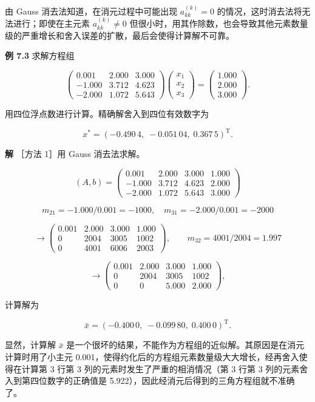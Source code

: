 \documentclass[
  10pt,
  fontset=fandol]{ctexart}
\begin{document}
由 Gauss 消去法知道，在消元过程中可能出现 \(a_{kk}^{(k)}=0\) 的情况，这时消去法将无法进行；即使在主元素 \(a_{kk}^{(k)}\ne0\) 但很小时，用其作除数，也会导致其他元素数量级的严重增长和舍入误差的扩散，最后会使得计算解不可靠。

\textbf{例 7.3} 求解方程组

\[
\begin{pmatrix}
0.001&2.000&3.000\\
-1.000&3.712&4.623\\
-2.000&1.072&5.643
\end{pmatrix}
\begin{pmatrix}x_1\\x_2\\x_3\end{pmatrix}
=\begin{pmatrix}1.000\\2.000\\3.000\end{pmatrix}.
\]

用四位浮点数进行计算。精确解舍入到四位有效数字为

\[x^*=(-0.490\,4,\;-0.051\,04,\;0.367\,5)^{\mathrm T}.\]

\textbf{解} ［方法 1］用 Gauss 消去法求解。

\[
(A,b)=\left(\begin{array}{rrr|r}
0.001&2.000&3.000&1.000\\
-1.000&3.712&4.623&2.000\\
-2.000&1.072&5.643&3.000
\end{array}\right)
\]

\[m_{21}=-1.000/0.001=-1000,\quad m_{31}=-2.000/0.001=-2000\]

\[
\longrightarrow\left(\begin{array}{rrr|r}
0.001&2.000&3.000&1.000\\
0&2004&3005&1002\\
0&4001&6006&2003
\end{array}\right),\qquad m_{32}=4001/2004=1.997
\]

\[
\longrightarrow\left(\begin{array}{rrr|r}
0.001&2.000&3.000&1.000\\
0&2004&3005&1002\\
0&0&5.000&2.000
\end{array}\right),
\]

计算解为

\[\bar{x}=(-0.400\,0,\;-0.099\,80,\;0.400\,0)^{\mathrm T}.\]

显然，计算解 \(\bar{x}\) 是一个很坏的结果，不能作为方程组的近似解。其原因是在消元计算时用了小主元 0.001，使得约化后的方程组元素数量级大大增长，经再舍入使得在计算第 3 行第 3 列的元素时发生了严重的相消情况（第 3 行第 3 列的元素舍入到第四位数字的正确值是 5.922），因此经消元后得到的三角方程组就不准确了。
\end{document}
